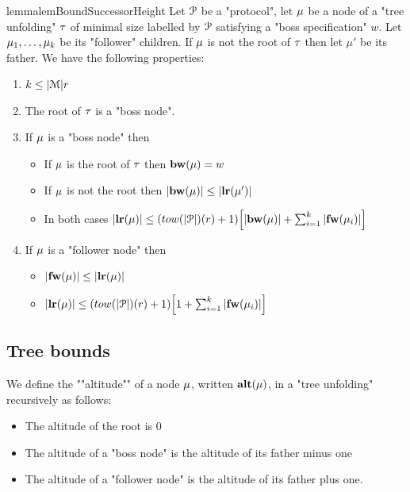\begin{restatable}{lemma}{lemBoundSuccessorHeight}
	\label{lem:bound-successor-height}
	Let $\mathcal{P}$ be a "protocol", let $\mu$ be a node of a "tree unfolding" $\tau$ of minimal size labelled by $\mathcal{P}$ satisfying a "boss specification" $w$.
	Let $\mu_1, \ldots, \mu_k$ be its "follower" children. If $\mu$ is not the root of $\tau$ then let $\mu'$ be its father.
	We have the following properties:
	
	\begin{enumerate}
		\item $k \leq |\mathcal{M}|r$ 
		
		\item The root of $\tau$ is a "boss node".
				
		\item  If $\mu$ is a "boss node" then 
		\begin{itemize}
			\item If $\mu$ is the root of $\tau$ then $\mathbf{bw}(\mu) = w$
			
			\item If $\mu$ is not the root then $|\mathbf{bw}(\mu)| \leq |\mathbf{lr}(\mu')|$
			
			\item In both cases $\size{\localrunlabel{\node}} \leq (\towerfun(\size{\prot})(r) + 1)\Big[ \size{\bosslabel{\node}} + \sum_{i=1}^k \size{\followlabelword{\node_i}} \Big]$
		\end{itemize}
	
		\item If $\mu$ is a "follower node" then 
		\begin{itemize}			
			\item $|\mathbf{fw}(\mu)| \leq |\mathbf{lr}(\mu)|$
			
			\item $\size{\localrunlabel{\node}} \leq (\towerfun(\size{\prot})(r) +1)\Big[ 1 + \sum_{i=1}^k \size{\followlabelword{\node_i}} \Big]$
			
		\end{itemize}
	\end{enumerate}
\end{restatable}


\subsection{Tree bounds}
\label{sec:tree-bounds}

\begin{definition}
	We define the ""altitude"" of a node $\mu$, written $\mathbf{alt}(\mu)$, in a "tree unfolding" recursively as follows:
	\begin{itemize}
		\item The altitude of the root is $0$
		
		\item The altitude of a "boss node" is the altitude of its father minus one
		
		\item The altitude of a "follower node" is the altitude of its father plus one.
	\end{itemize}
\end{definition}

